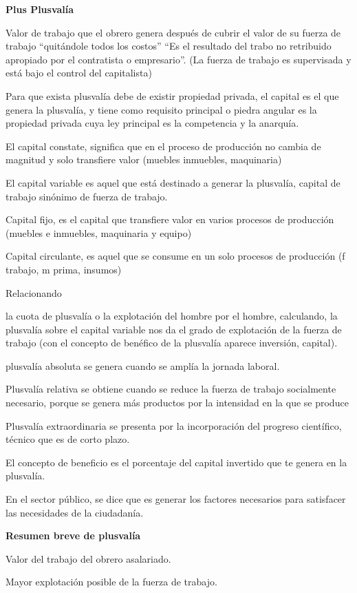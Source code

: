 \documentclass[
  letterpaper,
  DIV=11,
  numbers=noendperiod]{scrartcl}
\begin{document}
\textbf{Plus Plusvalía}

Valor de trabajo que el obrero genera después de cubrir el valor de su
fuerza de trabajo ``quitándole todos los costos'' ``Es el resultado del
trabo no retribuido apropiado por el contratista o empresario''. (La
fuerza de trabajo es supervisada y está bajo el control del capitalista)

Para que exista plusvalía debe de existir propiedad privada, el capital
es el que genera la plusvalía, y tiene como requisito principal o piedra
angular es la propiedad privada cuya ley principal es la competencia y
la anarquía.

El capital constate, significa que en el proceso de producción no cambia
de magnitud y solo transfiere valor (muebles inmuebles, maquinaria)

El capital variable es aquel que está destinado a generar la plusvalía,
capital de trabajo sinónimo de fuerza de trabajo.

Capital fijo, es el capital que transfiere valor en varios procesos de
producción (muebles e inmuebles, maquinaria y equipo)

Capital circulante, es aquel que se consume en un solo procesos de
producción (f trabajo, m prima, insumos)

Relacionando

la cuota de plusvalía o la explotación del hombre por el hombre,
calculando, la plusvalía sobre el capital variable nos da el grado de
explotación de la fuerza de trabajo (con el concepto de benéfico de la
plusvalía aparece inversión, capital).

plusvalía absoluta se genera cuando se amplía la jornada laboral.

Plusvalía relativa se obtiene cuando se reduce la fuerza de trabajo
socialmente necesario, porque se genera más productos por la intensidad
en la que se produce

Plusvalía extraordinaria se presenta por la incorporación del progreso
científico, técnico que es de corto plazo.

El concepto de beneficio es el porcentaje del capital invertido que te
genera en la plusvalía.

En el sector público, se dice que es generar los factores necesarios
para satisfacer las necesidades de la ciudadanía.

\textbf{Resumen breve de plusvalía}

Valor del trabajo del obrero asalariado.

Mayor explotación posible de la fuerza de trabajo.
\end{document}
